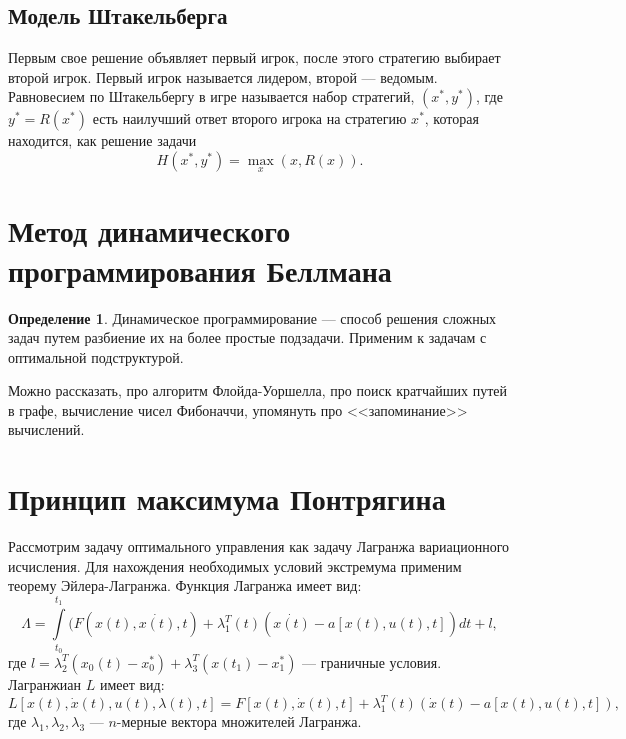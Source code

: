 \documentclass[12pt]{report}
\theoremstyle{definition}
\newtheorem{definition}[theorem]{Определение}
\begin{document}
\subsection{Модель Штакельберга}
Первым свое решение объявляет первый игрок, после этого стратегию выбирает
второй игрок. Первый игрок называется лидером, второй --- ведомым.
Равновесием по Штакельбергу в игре называется набор стратегий, $(x^*, y^*)$,
где $y^* = R(x^*)$ есть наилучший ответ второго игрока на стратегию $x^*$,
которая находится, как решение задачи
$$
H(x^*, y^*) = \max\limits_{x}(x, R(x)).
$$


\section
{
  Метод динамического программирования Беллмана
}

\begin{definition}
Динамическое программирование --- способ решения сложных задач путем разбиение
их на более простые подзадачи. Применим к задачам с оптимальной подструктурой.
\end{definition}

Можно рассказать, про алгоритм Флойда-Уоршелла, про поиск кратчайших путей в графе,
вычисление чисел Фибоначчи, упомянуть про <<запоминание>> вычислений.



\section
{
  Принцип максимума Понтрягина
}

Рассмотрим задачу оптимального управления как задачу Лагранжа вариационного исчисления.
Для нахождения необходимых условий экстремума применим теорему Эйлера-Лагранжа. Функция
Лагранжа имеет вид:
$$
\Lambda = 
\int\limits_{t_0}^{t_1} (F(x(t), \dot{x(t)}, t) + \lambda^T_1(t)(\dot{x(t)} - a[x(t), u(t), t]) dt + l,
$$
где $l = \lambda^T_2(x_0(t) - x^*_0) + \lambda^T_3(x(t_1) - x^*_1)$ --- граничные условия.
Лагранжиан $L$ имеет вид:
$$
L[x(t), \dot{x}(t), u(t), \lambda(t), t] = F[x(t), \dot{x}(t), t] + 
\lambda^T_1(t)(\dot{x}(t) - a[x(t), u(t), t]),
$$
где $\lambda_1, \lambda_2, \lambda_3$ --- $n$-мерные вектора множителей Лагранжа.
\end{document}
